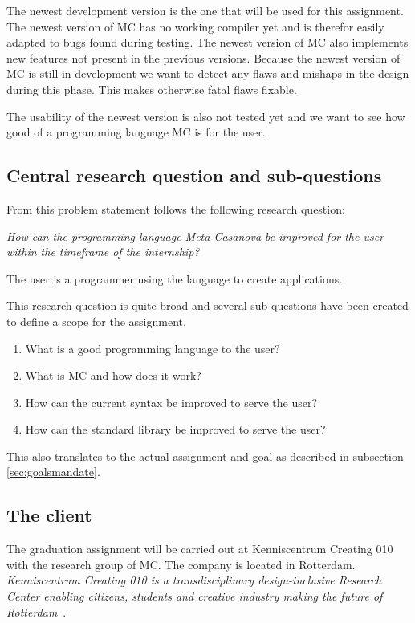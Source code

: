 The newest development version is the one that will be used for this assignment.
The newest version of MC has no working compiler yet and is therefor easily adapted to bugs found during testing.
The newest version of MC also implements new features not present in the previous versions.
Because the newest version of MC is still in development we want to detect any flaws and mishaps in the design during this phase.
This makes otherwise fatal flaws fixable.

The usability of the newest version is also not tested yet and we want to see how good of a programming language MC is for the user.

\subsection{Central research question and sub-questions}
From this problem statement follows the following research question:

\emph{How can the programming language Meta Casanova be improved for the user within the timeframe of the internship?}

The user is a programmer using the language to create applications.

This research question is quite broad and several sub-questions have been created to define a scope for the assignment.

\begin{enumerate}[noitemsep]
   \item What is a good programming language to the user?
   \item What is MC and how does it work?
   \item How can the current syntax be improved to serve the user?
   \item How can the standard library be improved to serve the user?
\end{enumerate}

This also translates to the actual assignment and goal as described in subsection \ref{sec:goalsmandate}.

\subsection{The client}\label{sec:clientmandate}
The graduation assignment will be carried out at Kenniscentrum Creating 010 with the research group of MC.
The company is located in Rotterdam.
\textit{Kenniscentrum Creating 010 is a transdisciplinary design-inclusive Research Center enabling citizens, students and creative industry making the future of Rotterdam}~\cite{creating2016home}.


